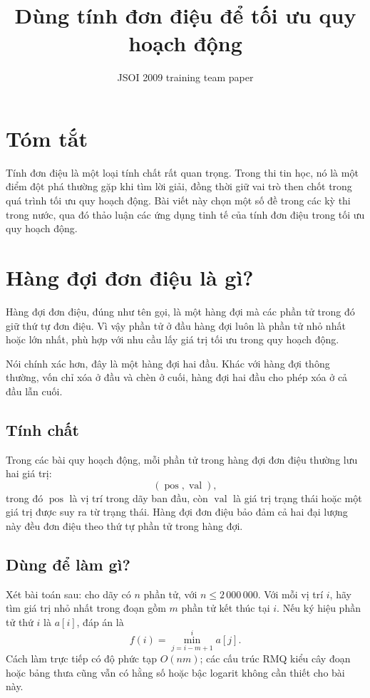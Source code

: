 \documentclass[11pt]{article}
\title{Dùng tính đơn điệu để tối ưu quy hoạch động}
\author{JSOI 2009 training team paper}
\date{}
\newcommand{\pos}{\operatorname{pos}}
\newcommand{\val}{\operatorname{val}}
\begin{document}
\maketitle


\section*{Tóm tắt}

Tính đơn điệu là một loại tính chất rất quan trọng. Trong thi tin học, nó là
một điểm đột phá thường gặp khi tìm lời giải, đồng thời giữ vai trò then chốt
trong quá trình tối ưu quy hoạch động. Bài viết này chọn một số đề trong các
kỳ thi trong nước, qua đó thảo luận các ứng dụng tinh tế của tính đơn điệu
trong tối ưu quy hoạch động.

\section{Hàng đợi đơn điệu là gì?}

Hàng đợi đơn điệu, đúng như tên gọi, là một hàng đợi mà các phần tử trong đó
giữ thứ tự đơn điệu. Vì vậy phần tử ở đầu hàng đợi luôn là phần tử nhỏ nhất
hoặc lớn nhất, phù hợp với nhu cầu lấy giá trị tối ưu trong quy hoạch động.

Nói chính xác hơn, đây là một hàng đợi hai đầu. Khác với hàng đợi thông
thường, vốn chỉ xóa ở đầu và chèn ở cuối, hàng đợi hai đầu cho phép xóa ở cả
đầu lẫn cuối.

\subsection*{Tính chất}

Trong các bài quy hoạch động, mỗi phần tử trong hàng đợi đơn điệu thường lưu
hai giá trị:
\[
  (\pos,\val),
\]
trong đó $\pos$ là vị trí trong dãy ban đầu, còn $\val$ là giá trị trạng thái
hoặc một giá trị được suy ra từ trạng thái. Hàng đợi đơn điệu bảo đảm cả hai
đại lượng này đều đơn điệu theo thứ tự phần tử trong hàng đợi.

\subsection*{Dùng để làm gì?}

Xét bài toán sau: cho dãy có $n$ phần tử, với $n\le 2\,000\,000$. Với mỗi vị
trí $i$, hãy tìm giá trị nhỏ nhất trong đoạn gồm $m$ phần tử kết thúc tại
$i$. Nếu ký hiệu phần tử thứ $i$ là $a[i]$, đáp án là
\[
  f(i)=\min_{j=i-m+1}^{i} a[j].
\]
Cách làm trực tiếp có độ phức tạp $O(nm)$; các cấu trúc RMQ kiểu cây đoạn
hoặc bảng thưa cũng vẫn có hằng số hoặc bậc logarit không cần thiết cho bài
này.
\end{document}
